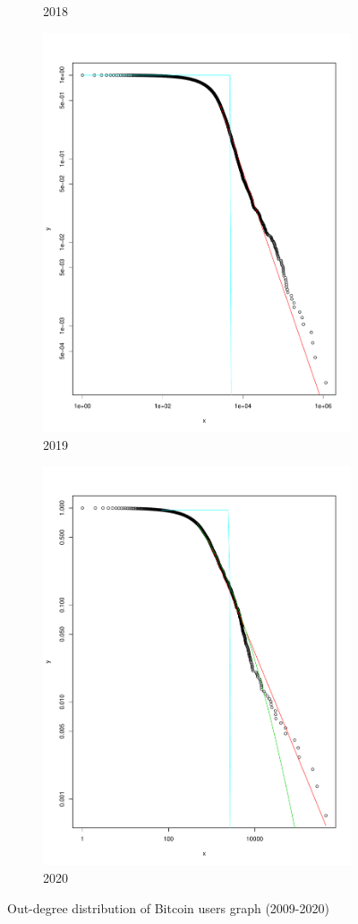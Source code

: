 \documentclass[preprint,12pt]{elsarticle}
\begin{document}
\begin{figure}[H]
\begin{subfigure}{.3\textwidth}
  \caption{2018}
  \label{fig:2018o}
\end{subfigure}
\begin{subfigure}{.3\textwidth}
  \centering
  \includegraphics[width=.8\linewidth]{Bitcoin-graphs/deg-dist-out-2019.pdf}  
  \caption{2019}
  \label{fig:2019o}
\end{subfigure}
\begin{subfigure}{.3\textwidth}
  \centering
  \includegraphics[width=.8\linewidth]{Bitcoin-graphs/deg-dist-out-2020.pdf}  
  \caption{2020}
  \label{fig:2020o}
\end{subfigure}
\caption{Out-degree distribution of Bitcoin users graph (2009-2020)}
\label{fig:outdegree}
\end{figure}
\end{document}
